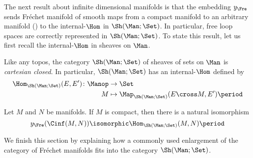 The next result about infinite dimensional manifolds is that the embedding $ y_{\Fre} $ sends Fréchet manifold of smooth maps from a compact manifold to an arbitrary manifold () to the internal-$ \Hom $ in $ \Sh(\Man;\Set) $.
In particular, free loop spaces are correctly represented in $ \Sh(\Man;\Set) $.
To state this result, let us first recall the internal-$ \Hom $ in sheaves on $ \Man $.

\begin{recollection}
	Like any topos, the category $ \Sh(\Man;\Set) $ of sheaves of sets on $ \Man $ is \textit{cartesian closed}.
	In particular, $ \Sh(\Man;\Set) $ has an internal-$ \Hom $ defined by
	\begin{align*}
		\Hom_{\Sh(\Man;\Set)}(E,E') \colon \Manop &\to \Set \\
		M &\mapsto \Map_{\Sh(\Man;\Set)}(E \cross M, E') \period
	\end{align*}
\end{recollection}

\begin{theorem}
	Let $ M $ and $ N $ be manifolds.
	If $ M $ is compact, then there is a natural isomorphism
	\begin{equation*}
		y_{\Fre}(\Cinf(M,N)) \isomorphic \Hom_{\Sh(\Man;\Set)}(M,N) \period
	\end{equation*}
\end{theorem}

We finish this section by explaining how a commonly used enlargement of the category of Fréchet manifolds fits into the category $ \Sh(\Man;\Set) $.


